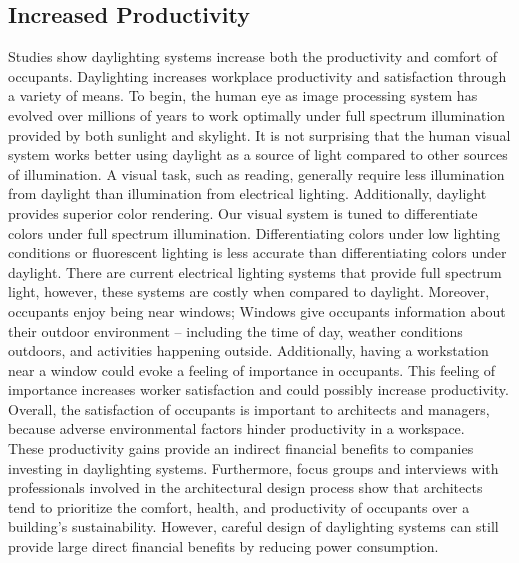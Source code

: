   \subsection{Increased Productivity}
    Studies show daylighting systems increase both the productivity and comfort of occupants\cite{Menzies}. Daylighting increases workplace productivity and satisfaction through a variety of means. To begin, the human eye as image processing system has evolved over millions of years to work optimally under full spectrum illumination provided by both sunlight and skylight. It is not surprising that the human visual system works better using daylight as a source of light compared to other sources of illumination. A visual task, such as reading, generally require less illumination from daylight than illumination from electrical lighting\cite{Robbins}. Additionally, daylight provides superior color rendering. Our visual system is tuned to differentiate colors under full spectrum illumination. Differentiating colors under low lighting conditions or fluorescent lighting is less accurate than differentiating colors under daylight\cite{Robbins}. There are current electrical lighting systems that provide full spectrum light, however, these systems are costly when compared to daylight. Moreover, occupants enjoy being near windows; Windows give occupants information about their outdoor environment -- including the time of day, weather conditions outdoors, and activities happening outside. Additionally, having a workstation near a window could evoke a feeling of importance in occupants. This feeling of importance increases worker satisfaction and could possibly increase productivity\cite{Leslie}. Overall, the satisfaction of occupants is important to architects and managers, because adverse environmental factors hinder productivity in a workspace.  \\

    These productivity gains provide an indirect financial benefits to companies investing in daylighting systems. 
    Furthermore, focus groups and interviews with professionals involved in the architectural design process show that architects tend to prioritize the comfort, health, and productivity of occupants over a building’s sustainability\cite{Menzies}. However, careful design of daylighting systems can still provide large direct financial benefits by reducing power consumption.

